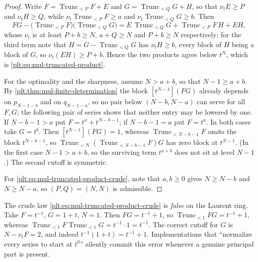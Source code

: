 \documentclass[11pt,oneside]{article}
\theoremstyle{plain}
\theoremstyle{definition}
\theoremstyle{remark}
\newcommand{\ordt}{\nu_{t}}                              %
\newcommand{\Trunc}[2]{\operatorname{Trunc}_{<#2}#1}     %
\begin{document}
\begin{proof}
Write $F=\Trunc{F}{P}+E$ and $G=\Trunc{G}{Q}+H$, so that $\ordt E\ge P$ and
$\ordt H\ge Q$, while $\ordt\Trunc{F}{P}\ge a$ and $\ordt\Trunc{G}{Q}\ge b$.
Then
\[
 FG-\bigl(\Trunc{F}{P}\bigr)\bigl(\Trunc{G}{Q}\bigr)
 =E\,\Trunc{G}{Q}+\Trunc{F}{P}\,H+EH,
\]
whose $\ordt$ is at least $P+b\ge N$, $a+Q\ge N$ and $P+b\ge N$
respectively; for the third term note that $H=G-\Trunc{G}{Q}$ has
$\ordt H\ge b$, every block of $H$ being a block of $G$, so
$\ordt(EH)\ge P+b$.  Hence the two products agree below $t^N$, which is
\eqref{plt:eq:mul-truncated-product}.

For the optimality and the sharpness, assume $N>a+b$, so that $N-1\ge a+b$.
By \cref{plt:thm:mul-finite-determination} the block $[t^{N-1}](FG)$ already
depends on $p_{N-1-b}$ and on $q_{N-1-a}$, so no pair below $(N-b,N-a)$ can
serve for all $F,G$; the following pair of series shows that neither entry
may be lowered by one.  If $N-b-1>a$ put $F=t^a+t^{N-b-1}$; if
$N-b-1=a$ put $F=t^a$.  In both cases take $G=t^b$.  Then
$[t^{N-1}](FG)=1$, whereas $\Trunc{F}{N-b-1}$ omits the block $t^{N-b-1}$,
so $\Trunc{(\Trunc{F}{N-b-1})G}{N}$ has zero block at $t^{N-1}$.  (In the
first case $N-1>a+b$, so the surviving term $t^{a+b}$ does not sit at
level $N-1$.)  The second cutoff is symmetric.

For \eqref{plt:eq:mul-truncated-product-crude}, note that $a,b\ge0$ gives
$N\ge N-b$ and $N\ge N-a$, so $(P,Q)=(N,N)$ is admissible.
\end{proof}

\begin{warningbox}
The crude law \eqref{plt:eq:mul-truncated-product-crude} is \emph{false} on
the Laurent ring.  Take $F=t^{-1}$, $G=1+t$, $N=1$.  Then $FG=t^{-1}+1$, so
$\Trunc{FG}{1}=t^{-1}+1$, whereas
$\Trunc{F}{1}\Trunc{G}{1}=t^{-1}\cdot1=t^{-1}$.  The correct cutoff for $G$
is $N-\ordt F=2$, and indeed $t^{-1}(1+t)=t^{-1}+1$.  Implementations that
``normalize every series to start at $t^0$'' silently commit this error
whenever a genuine principal part is present.
\end{warningbox}
\end{document}
